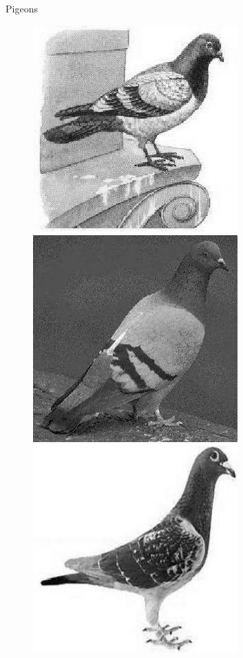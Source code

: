 \documentclass{beamer}
\begin{document}
\begin{frame}{Pigeons}
  \begin{figure}
    \centering
    \includegraphics[scale=.4]{pigeonrs-image_0001.jpg}
    \includegraphics[scale=.4]{pigeonrs-image_0002.jpg} \\
    \includegraphics[scale=.4]{pigeonrs-image_0003.jpg}

\end{figure}
\end{frame}
\end{document}
